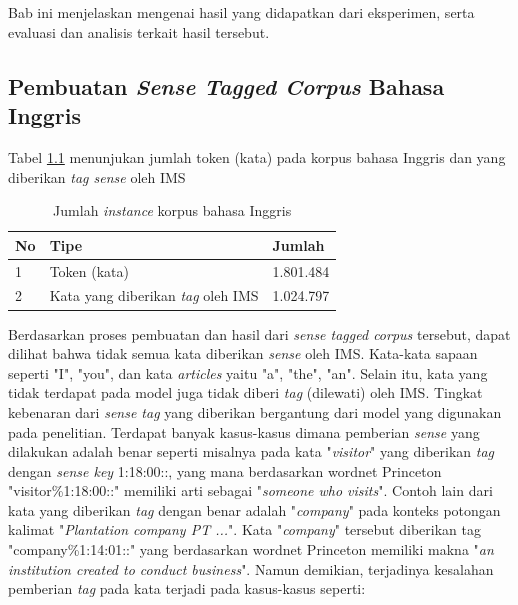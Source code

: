 \chapter{\babLima}
Bab ini menjelaskan mengenai hasil yang didapatkan dari eksperimen, serta evaluasi dan analisis terkait hasil tersebut.

\section{Pembuatan \textit{Sense Tagged Corpus} Bahasa Inggris}
Tabel \ref{table:sense-tagged-corpus} menunjukan jumlah token (kata) pada korpus bahasa Inggris dan yang diberikan \textit{tag sense} oleh IMS

\begin{table}
	\centering
	\caption{Jumlah \textit{instance} korpus bahasa Inggris}
	\label{table:sense-tagged-corpus}
	\begin{tabular}{|p{0.7cm}|p{4cm}|p{4cm}|}
		\hline
		No & Tipe & Jumlah
		\\ \hline
		1    & 
		Token (kata)   & 
		1.801.484
		\\ \hline
		2    & 
		Kata yang diberikan \textit{tag} oleh IMS     & 
		1.024.797 
		\\ \hline
	\end{tabular}
\end{table}

Berdasarkan proses pembuatan dan hasil dari \textit{sense tagged corpus} tersebut, dapat dilihat bahwa tidak semua kata diberikan \textit{sense} oleh IMS. Kata-kata sapaan seperti "I", "you", dan kata \textit{articles} yaitu "a", "the", "an". Selain itu, kata yang tidak terdapat pada model juga tidak diberi \textit{tag} (dilewati) oleh IMS. Tingkat kebenaran dari \textit{sense tag} yang diberikan bergantung dari model yang digunakan pada penelitian. Terdapat banyak kasus-kasus dimana pemberian \textit{sense} yang dilakukan adalah benar seperti misalnya pada kata "\textit{visitor}" yang diberikan \textit{tag} dengan \textit{sense key} 1:18:00::, yang mana berdasarkan wordnet Princeton "visitor\%1:18:00::" memiliki arti sebagai "\textit{someone who visits}". Contoh lain dari kata yang diberikan \textit{tag} dengan benar adalah "\textit{company}" pada konteks potongan kalimat "\textit{Plantation company PT ...}". Kata "\textit{company}" tersebut diberikan tag "company\%1:14:01::" yang berdasarkan wordnet Princeton memiliki makna "\textit{an institution created to conduct business}". Namun demikian, terjadinya kesalahan pemberian \textit{tag} pada kata terjadi pada kasus-kasus seperti: 


